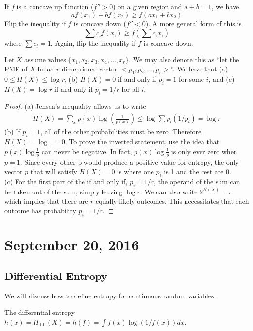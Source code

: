 \documentclass[11pt]{article}
\theoremstyle{definition}
\begin{document}
 If $f$ is a concave up function ($f'' > 0$) on a given region and $a+b = 1$, we have $$af(x_1) + b f(x_2) \geq f(ax_1 + bx_2)$$Flip the inequality if $f$ is concave down ($f'' < 0$). A more general form of this is $$\sum c_i f(x_i) \geq f(\sum c_i x_i)$$where $\sum c_i = 1$. Again, flip the inequality if $f$ is concave down. 

\theorem Let $X$ assume values $\{x_1, x_2, x_3, x_4, \dots, x_r \}$. We may also denote this as ``let the PMF of $X$ be an $r$-dimensional vector $<p_1, p_2, \dots, p_r >$''. We have that (a) $0 \leq H(X) \leq \log r$, (b) $H(X) = 0$ if and only if $p_i = 1$ for some $i$, and (c) $H(X) = \log r$ if and only if $p_i = 1/r$ for all $i$. 

\begin{proof}
(a) Jensen's inequality allows us to write 
\begin{align*}
H(X) = \sum_x p(x) \log \left( \frac{1}{p(x)} \right) \leq \log \sum p_i (1/p_i) = \log r
\end{align*}
(b) If $p_i = 1$, all of the other probabilities must be zero. Therefore, $H(X) = \log 1 = 0.$
     To prove the inverted statement, use the idea that $p(x) \log{\frac{1}{p}}$ can never be negative. In fact, $p(x) \log{\frac{1}{p}}$ is only
     ever zero when $p=1$. Since every other p would produce a positive value for entropy, the only vector $p$ that will satisfy $H(X) = 0$ is 
     where one $p_i$ is 1 and the rest are 0. \\
     
\noindent (c) For the first part of the if and only if, $p_i = 1/r$, the operand of the sum can be taken out of the sum, simply leaving $\log r$. We can also write $2^{H(X)} = r$ which implies that there are $r$ equally likely outcomes. This necessitates that each outcome has probability $p_i = 1/r$. 
\end{proof}

\section{September 20, 2016}

\subsection{Differential Entropy}

We will discuss how to define entropy for continuous random variables. 

\theorem The differential entropy $h(x) = H_{\mathrm{diff}}(X) = h(f) = \int f(x) \log (1/f(x)) dx$. 
\end{document}
